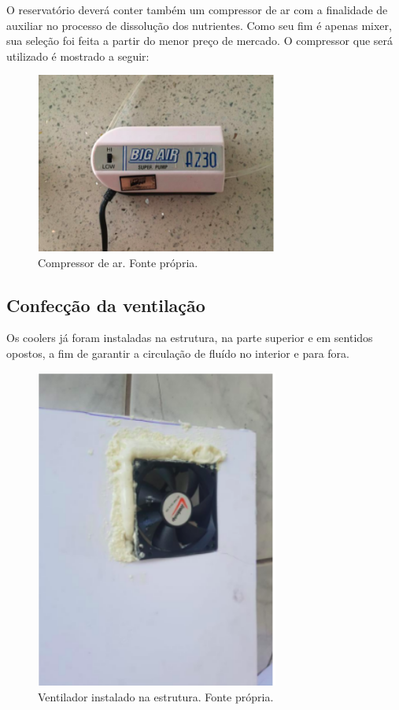 O reservatório deverá conter também um compressor de ar com a finalidade de auxiliar no processo de dissolução dos nutrientes. Como seu fim é apenas mixer, sua seleção foi feita a partir do menor preço de mercado. O compressor que será utilizado é mostrado a seguir:

\begin{figure}[H]
	\centering
	\includegraphics[width=8cm]{figuras/compressor.png}
	\caption{Compressor de ar. Fonte própria.}
	\label{compressor}
\end{figure}


\subsection{Confecção da ventilação}

Os coolers já foram instaladas na estrutura, na parte superior e em sentidos opostos, a fim de garantir a circulação de fluído no interior e para fora.

\begin{figure}[H]
	\centering
	\includegraphics[width=8cm]{figuras/ventilador.png}
	\caption{Ventilador instalado na estrutura. Fonte própria.}
	\label{ventilador}
\end{figure}

